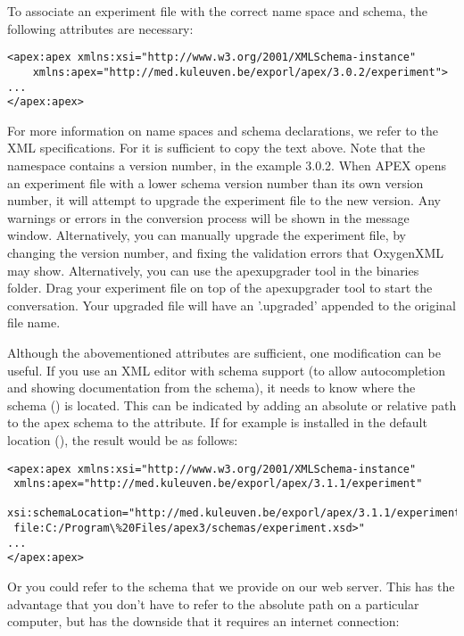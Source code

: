 To associate an experiment file with the correct name space and
schema, the following attributes are necessary:


\begin{lstlisting}
<apex:apex xmlns:xsi="http://www.w3.org/2001/XMLSchema-instance"
    xmlns:apex="http://med.kuleuven.be/exporl/apex/3.0.2/experiment">
...
</apex:apex>
\end{lstlisting}

For more information on name spaces and schema declarations, we
refer to the XML specifications. For \apex it is sufficient to
copy the text above. Note that the namespace contains a version number, in the example 3.0.2. When APEX opens an experiment file with a lower schema version number than its own version number, it will attempt to upgrade the experiment file to the new version. Any warnings or errors in the conversion process will be shown in the message window. Alternatively, you can manually upgrade the experiment file, by changing the version number, and fixing the validation errors that OxygenXML may show. Alternatively, you can use the apexupgrader tool in the \apex binaries folder. Drag your experiment file on top of the apexupgrader tool to start the conversation. Your upgraded file will have an '.upgraded' appended to the original file name.

Although the abovementioned attributes are sufficient, one modification can be useful.
If you use an XML editor with schema support (to allow
autocompletion and showing documentation from the schema), it
needs to know where the \apex schema ()
is located. This can be indicated by adding an absolute or
relative path to the apex schema to the
 attribute. If for example \apex is installed in the
default location (), the result
would be as follows:

\begin{lstlisting}
<apex:apex xmlns:xsi="http://www.w3.org/2001/XMLSchema-instance"
 xmlns:apex="http://med.kuleuven.be/exporl/apex/3.1.1/experiment"
 xsi:schemaLocation="http://med.kuleuven.be/exporl/apex/3.1.1/experiment
 file:C:/Program\%20Files/apex3/schemas/experiment.xsd>"
...
</apex:apex>
\end{lstlisting}

Or you could refer to the schema that we provide on our web server. This has the advantage that you don't have to refer to the absolute path on a particular computer, but has the downside that it requires an internet connection:

